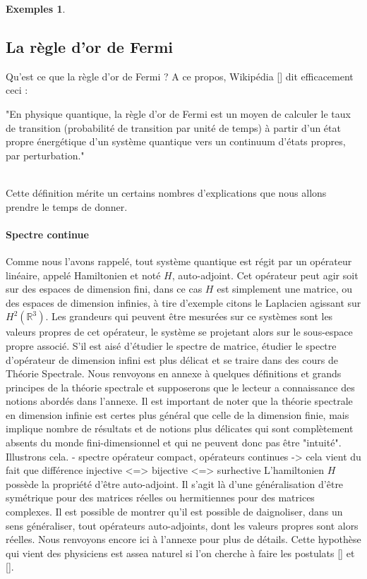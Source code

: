 \documentclass[12pt,openany,a4paper, titlepage]{article}
\newcommand{\R}{\mathbb{R}}
\theoremstyle{definition}
\theoremstyle{definition}
\theoremstyle{definition}
\theoremstyle{definition}
\newtheorem{exs}{Exemples}
\theoremstyle{definition}
\theoremstyle{definition}
\begin{document}
\begin{exs}
    
\end{exs}

\subsection{La règle d'or de Fermi} 

Qu'est ce que la règle d'or de Fermi ? A ce propos, Wikipédia [] dit efficacement ceci : \\

\begin{it}
    "En physique quantique, la règle d'or de Fermi est un moyen de calculer le taux de transition (probabilité de transition par unité de temps) à partir d'un état propre énergétique d'un système quantique vers un continuum d'états propres, par perturbation."
\end{it}\\

Cette définition mérite un certains nombres d'explications que nous allons  prendre le temps de donner. 

\paragraph{Spectre continue}
Comme nous l'avons rappelé, tout système quantique est régit par un opérateur linéaire, appelé Hamiltonien et noté $H$, auto-adjoint. Cet opérateur peut agir soit sur des espaces  de dimension fini, dans ce cas $H$ est simplement une matrice, ou des espaces de dimension infinies, à tire d'exemple citons le Laplacien agissant sur $H^2(\R^3)$. Les grandeurs qui peuvent être mesurées sur ce systèmes sont les valeurs propres de cet opérateur, le système se projetant alors sur le sous-espace propre associé. S'il est aisé d'étudier le spectre de matrice, étudier le spectre d'opérateur de dimension infini est plus délicat et se traire dans des cours de Théorie Spectrale. Nous renvoyons en annexe à quelques définitions et grands principes de la théorie spectrale et supposerons que le lecteur a connaissance des notions abordés dans l'annexe. Il est important de noter que la théorie spectrale en dimension infinie est certes plus général que celle de la dimension finie, mais implique nombre de résultats et de notions plus délicates qui sont complètement absents du monde fini-dimensionnel et qui ne peuvent donc pas être "intuité". Illustrons cela.
- spectre opérateur compact, opérateurs continues -> cela vient du fait que différence injective <=> bijective <=> surhective
L'hamiltonien $H$ possède la propriété d'être auto-adjoint. Il s'agit là d'une généralisation d'être symétrique pour des matrices réelles ou hermitiennes pour des matrices complexes. Il est possible de montrer qu'il est possible de daignoliser, dans un sens généraliser, tout opérateurs auto-adjoints, dont les valeurs propres sont alors réelles. Nous renvoyons encore ici à l'annexe pour plus de détails. Cette hypothèse qui vient des physiciens est assea naturel si l'on cherche à faire les postulats [] et [].
\end{document}
